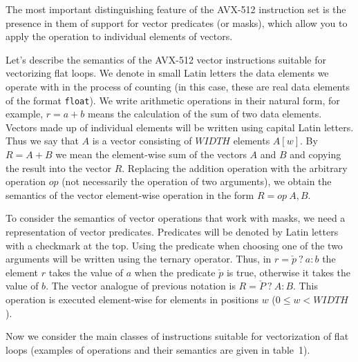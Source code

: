 \documentclass[
11pt,%
tightenlines,%
twoside,%
onecolumn,%
nofloats,%
nobibnotes,%
nofootinbib,%
superscriptaddress,%
noshowpacs,%
centertags]%
{revtex4}
\begin{document}
The most important distinguishing feature of the AVX-512 instruction set is the presence in them of support for vector predicates (or masks), which allow you to apply the operation to individual elements of vectors.

Let's describe the semantics of the AVX-512 vector instructions suitable for vectorizing flat loops.
We denote in small Latin letters the data elements we operate with in the process of counting (in this case, these are real data elements of the format \texttt{float}).
We write arithmetic operations in their natural form, for example, $r = a + b$ means the calculation of the sum of two data elements.
Vectors made up of individual elements will be written using capital Latin letters.
Thus we say that $A$ is a vector consisting of $WIDTH$ elements $A[w]$.
By $R = A + B$ we mean the element-wise sum of the vectors $A$ and $B$ and copying the result into the vector $R$.
Replacing the addition operation with the arbitrary operation $op$ (not necessarily the operation of two arguments), we obtain the semantics of the vector element-wise operation in the form $R = op \ A, B$.

To consider the semantics of vector operations that work with masks, we need a representation of vector predicates.
Predicates will be denoted by Latin letters with a checkmark at the top.
Using the predicate when choosing one of the two arguments will be written using the ternary operator.
Thus, in $r = \check{p} \ ? \ a : b$ the element $r$ takes the value of $a$ when the predicate $\check{p}$ is true, otherwise it takes the value of $b$.
The vector analogue of previous notation is $R = \check{P} \ ? \ A : B$.
This operation is executed element-wise for elements in positions $w$ ($0 \le w < WIDTH$).

Now we consider the main classes of instructions suitable for vectorization of flat loops (examples of operations and their semantics are given in table~1).
\end{document}
